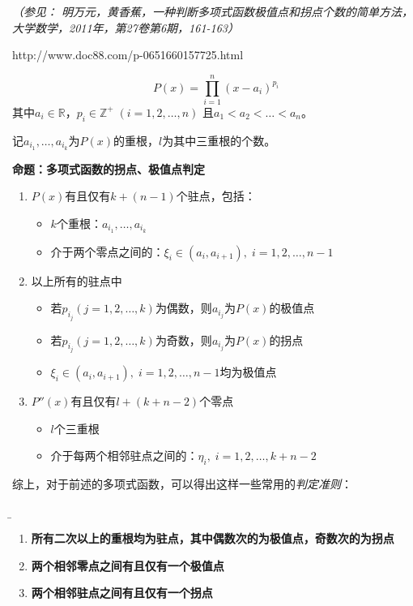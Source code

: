 \begin{shaded}
	{\it（参见： 明万元，黄香蕉，一种判断多项式函数极值点和拐点个数的简单方法，
	大学数学，2011年，第27卷第6期，161-163）
	
	http://www.doc88.com/p-0651660157725.html}
	$$P(x)=\prod_{i=1}^n(x-a_i)^{p_i}$$
	其中$a_i\in\mathbb{R}$，$p_i\in\mathbb{Z}^+\;(i=1,2,\ldots,n)$
	且$a_1<a_2<\ldots<a_n$。
	
	记$a_{i_1},\ldots,a_{i_k}$为$P(x)$的重根，$l$为其中三重根的个数。
	
	{\bf 命题：}{\bf 多项式函数的拐点、极值点判定}
	\begin{enumerate}
  	  \setlength{\itemindent}{1cm}
	  \item $P(x)$有且仅有$k+(n-1)$个驻点，包括：
	  \begin{itemize}
	    \setlength{\itemindent}{0.5cm}
	    \item $k$个重根：$a_{i_1},\ldots,a_{i_k}$
	    \item 介于两个零点之间的：$\xi_i\in(a_i,a_{i+1}),\;i=1,2,\ldots,n-1$
	  \end{itemize}
	  \item 以上所有的驻点中
	  \begin{itemize}
	    \setlength{\itemindent}{0.5cm}
	    \item 若$p_{i_j}(j=1,2,\ldots,k)$为偶数，则$a_{i_j}$为$P(x)$的极值点
	    \item 若$p_{i_j}(j=1,2,\ldots,k)$为奇数，则$a_{i_j}$为$P(x)$的拐点
	    \item $\xi_i\in(a_i,a_{i+1}),\;i=1,2,\ldots,n-1$均为极值点
	  \end{itemize}
	  \item $P''(x)$有且仅有$l+(k+n-2)$个零点
	  \begin{itemize}
	    \setlength{\itemindent}{0.5cm}
	    \item $l$个三重根
	    \item 介于每两个相邻驻点之间的：$\eta_i,\;i=1,2,\ldots,k+n-2$
	  \end{itemize}
	\end{enumerate}
	
	综上，对于前述的多项式函数，可以得出这样一些常用的{\it 判定准则}：{\b
	\begin{enumerate}[(1)]
  	  \setlength{\itemindent}{1cm}
	  \item {\bf 所有二次以上的重根均为驻点，其中偶数次的为极值点，奇数次的为拐点}
	  \item {\bf 两个相邻零点之间有且仅有一个极值点}
	  \item {\bf 两个相邻驻点之间有且仅有一个拐点}
	\end{enumerate}}
	

\end{shaded}
